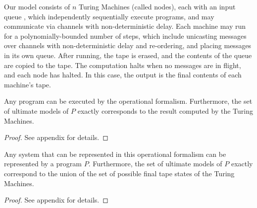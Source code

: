 
Our model consists of $n$ Turing Machines (called nodes), each with an input queue , which independently sequentially execute programs, and may communicate via channels with non-deterministic  delay.  Each machine may run for a polynomially-bounded number of steps, which include unicasting  messages over channels  with non-deterministic delay and re-ordering, and placing messages in its own queue.  After running, the tape is erased, and the contents of the queue are copied to the tape.  The computation halts when no messages are in flight, and each node has halted.  In this case, the output is the final contents of each machine's tape.

\begin{lemma}
\label{lem:dedalus2turing}
Any \lang program can be executed by the operational formalism.  Furthermore, the set of ultimate models of $P$ exactly corresponds to the result computed by the Turing Machines.
\end{lemma}
\begin{proof}
See appendix for details.
\end{proof}

\begin{lemma}
\label{lem:turing2dedalus}
Any system that can be represented in this operational formalism can be represented by a \lang program $P$.  Furthermore, the set of ultimate models of $P$ exactly correspond to the union of the set of possible final tape states of the Turing Machines.
\end{lemma}
\begin{proof}
See appendix for details.
\end{proof}


